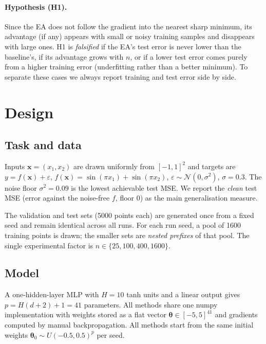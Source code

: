\documentclass[11pt]{article}
\newcommand{\nfloor}{\sigma^2}
\begin{document}
\paragraph{Hypothesis (H1).}
Since the EA does not follow the gradient into the nearest sharp minimum, its advantage (if any) appears
with small or noisy training samples and disappears with large ones.
H1 is \emph{falsified} if the EA's test error is never lower than the baseline's, if its advantage
grows with $n$, or if a lower test error comes purely from a higher training error (underfitting rather
than a better minimum). To separate these cases we always report training and test error side by side.



\section{Design}

\subsection{Task and data}

Inputs $\bm x=(x_1,x_2)$ are drawn uniformly from $[-1,1]^2$ and targets are
$y = f(\bm x) + \varepsilon$, $f(\bm x)=\sin(\pi x_1)+\sin(\pi x_2)$,
$\varepsilon\sim\mathcal{N}(0,\sigma^2)$, $\sigma=0.3$.
The noise floor $\nfloor=0.09$ is the lowest achievable test MSE. We report the \emph{clean} test MSE
(error against the noise-free $f$, floor $0$) as the main generalisation measure.

The validation and test sets (5000 points each) are generated once from a fixed seed and remain
identical across all runs. For each run seed, a pool of 1600 training points is drawn; the smaller
sets are \emph{nested prefixes} of that pool. The single experimental factor is $n\in\{25,100,400,1600\}$.

\subsection{Model}

A one-hidden-layer MLP with $H=10$ tanh units and a linear output gives $p=H(d+2)+1=41$ parameters.
All methods share one numpy implementation with weights stored as a flat vector $\bm\theta\in[-5,5]^{41}$
and gradients computed by manual backpropagation. All methods start from the same initial weights
$\bm\theta_0\sim U(-0.5,0.5)^{p}$ per seed.
\end{document}
